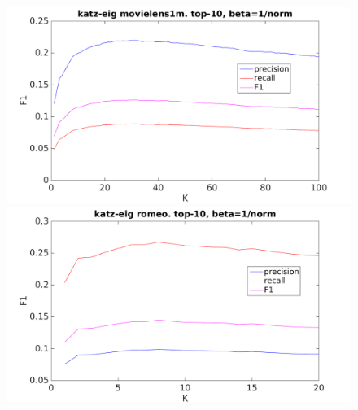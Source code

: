 \begin{figure}[h!]
\centering
\begin{minipage}{.5\textwidth}
    \centering
    \includegraphics[width=\linewidth]{fig/katzeig_k/movielens_katzeig_K.png}
\end{minipage}%
\begin{minipage}{.5\textwidth}
    \centering
    \includegraphics[width=\linewidth]{fig/katzeig_k/romeo_katzeig_K.png}
\end{minipage}
\end{figure}



